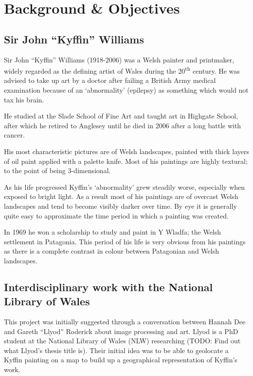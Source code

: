 \chapter{Background \& Objectives}


\section{Sir John ``Kyffin'' Williams}

Sir John ``Kyffin'' Williams (1918-2006) was a Welsh painter and printmaker, widely regarded as 
the defining artist of Wales during the 20\textsuperscript{th} century\cite{Davies2008Welsh}. He was advised to take up
art by a doctor after failing a British Army medical examination because of an `abnormality' 
(epilepsy) as something which would not tax his brain.

He studied at the Slade School of Fine Art and taught art in Highgate School, after which he 
retired to Anglesey until he died in 2006 after a long battle with cancer.

His most characteristic pictures are of Welsh landscapes, painted with thick layers of oil paint
applied with a palette knife\cite{Chilvers2009Dictionary}. Most of his paintings are highly textural; to the point of being
3-dimensional.

As his life progressed Kyffin's `abnormality' grew steadily worse, especially when exposed to 
bright light. As a result most of his paintings are of overcast Welsh landscapes and tend to 
become visibly darker over time\cite{Harris2011How}. By eye it is generally quite easy to approximate the time period
in which a painting was created.

In 1969 he won a scholarship to study and paint in Y Wladfa; the Welsh settlement in Patagonia.
This period of his life is very obvious from his paintings as there is a complete contrast in 
colour between Patagonian and Welsh landscapes.


\section{Interdisciplinary work with the National Library of Wales}

This project was initially suggested through a conversation between Hannah Dee and Gareth ``Llyod''
Roderick about image processing and art. Llyod is a PhD student at the National Library of Wales 
(NLW) researching (TODO: Find out what Llyod's thesis title is). Their initial idea was to be able
to geolocate a Kyffin painting on a map to build up a geographical representation of Kyffin's 
work.

